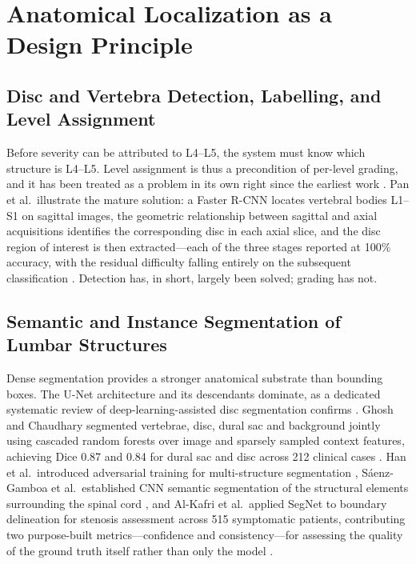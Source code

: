 \section{Anatomical Localization as a Design Principle}
\label{sec:lr-localization}

\subsection{Disc and Vertebra Detection, Labelling, and Level Assignment}
\label{sec:lr-detection}

Before severity can be attributed to L4--L5, the system must know which structure
is L4--L5. Level assignment is thus a precondition of per-level grading, and it
has been treated as a problem in its own right since the earliest work
\cite{ghosh2012a,lootus2015automated}. Pan et al.\ illustrate the mature
solution: a Faster R-CNN locates vertebral bodies L1--S1 on sagittal images, the
geometric relationship between sagittal and axial acquisitions identifies the
corresponding disc in each axial slice, and the disc region of interest is then
extracted---each of the three stages reported at 100\% accuracy, with the residual
difficulty falling entirely on the subsequent classification
\cite{pan2021automatically}. Detection has, in short, largely been solved;
grading has not.

\subsection{Semantic and Instance Segmentation of Lumbar Structures}
\label{sec:lr-segmentation}

Dense segmentation provides a stronger anatomical substrate than bounding boxes.
The U-Net architecture \cite{ronneberger2015unet} and its descendants dominate,
as a dedicated systematic review of deep-learning-assisted disc segmentation
confirms \cite{wang2024deep}.
Ghosh and Chaudhary segmented vertebrae, disc, dural sac and background jointly
using cascaded random forests over image and sparsely sampled context features,
achieving Dice 0.87 and 0.84 for dural sac and disc across 212 clinical cases
\cite{ghosh2014supervised}. Han et al.\ introduced adversarial training for
multi-structure segmentation \cite{han2018spinegan}, S\'aenz-Gamboa et al.\
established CNN semantic segmentation of the structural elements surrounding the
spinal cord \cite{senzgamboa2021automatic}, and Al-Kafri et al.\ applied
SegNet to boundary delineation for stenosis assessment across 515 symptomatic
patients, contributing two purpose-built metrics---confidence and
consistency---for assessing the quality of the ground truth itself rather than
only the model \cite{alkafri2019boundary}.


